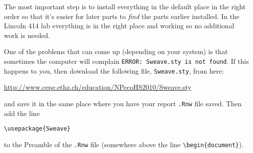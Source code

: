 \documentclass[10pt,english]{article}
\begin{document}
The most important step is to install everything in the default place in the right order so that it's easier for later parts to \emph{find} the parts earlier installed.  In the Lincoln 414 lab everything is in the right place and working so no additional work is needed.

One of the problems that can come up (depending on your system) is
that sometimes the computer will complain \texttt{ERROR: Sweave.sty is not
found}.  If this happens to you, then download the following file,
\texttt{Sweave.sty}, from here:
\begin{center}
\url{http://www.cepe.ethz.ch/education/NPecoHS2010/Sweave.sty}
\end{center}
and save it in the same place where you have your report \texttt{.Rnw} file
saved.  Then add the line

\begin{verbatim}
\usepackage{Sweave}
\end{verbatim}

to the Preamble of the \texttt{.Rnw} file (somewhere above the line \texttt{\textbackslash{}begin\{document\}}).
\end{document}
